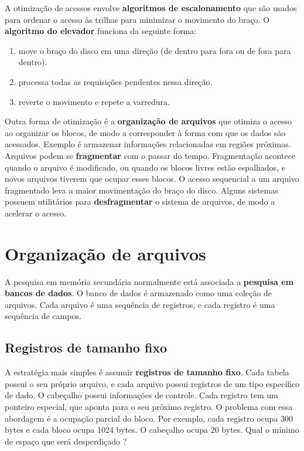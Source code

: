 A otimização de acessos envolve \textbf{algoritmos de escalonamento} que são usados para ordenar o 
acesso às trilhas para minimizar o  movimento do braço.
O \textbf{algoritmo do elevador} funciona da seguinte forma:
\begin{enumerate}
\item move o braço do disco em uma direção (de dentro para fora ou de fora para dentro).
\item processa todas as requisições pendentes nessa direção.
\item reverte o movimento e repete a varredura.
\end{enumerate}

Outra forma de otimização é a \textbf{organização de arquivos} que otimiza o acesso ao
organizar os blocos, de modo a corresponder à forma com que os dados são acessados.
Exemplo é armazenar informações relacionadas em regiões próximas.
Arquivos podem se \textbf{fragmentar} com o passar do tempo.
Fragmentação acontece quando o arquivo é modificado, ou quando os blocos livres
estão espalhados, e novos arquivos tiverem que ocupar esses blocos.
O acesso sequencial a um arquivo fragmentado leva a maior movimentação do
braço do disco. 
Alguns sistemas possuem utilitários para \textbf{desfragmentar} o sistema
de arquivos, de modo a acelerar o acesso.

\section{Organização de arquivos}

A pesquisa em memória secundária normalmente está associada a \textbf{pesquisa 
em bancos de dados}.
O banco de dados é armazenado como uma coleção de arquivos. Cada arquivo
é uma sequência de registros, e cada registro é uma sequência de campos.

\subsection{Registros de tamanho fixo}

A estratégia mais simples é assumir \textbf{registros de tamanho fixo}.
Cada tabela possui o seu próprio arquivo, e cada arquivo possui registros
de um tipo específico de dado.
O cabeçalho possui informações de controle. Cada registro tem um ponteiro
especial, que aponta para o seu próximo registro.
O problema com essa abordagem é a ocupação parcial do bloco.
Por exemplo, cada registro ocupa 300 bytes e cada bloco ocupa 1024 bytes.
O cabeçalho ocupa 20 bytes. Qual o mínimo de espaço que será desperdiçado ?

